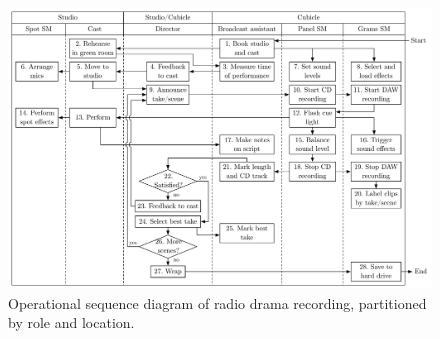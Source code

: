 \begin{figure}[p]
  \centering
  \includegraphics[angle=90,width=\columnwidth]{figs/drama-recording-workflow.pdf}
  \caption{Operational sequence diagram of radio drama recording, partitioned by role and location.}
  \label{fig:ethno-drama-recording}
\end{figure}

